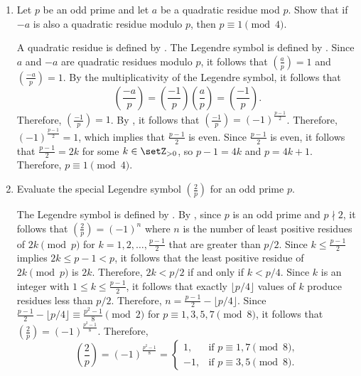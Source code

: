 \begin{enumerate}
  \item Let $p$ be an odd prime and let $a$ be a quadratic residue mod $p$. Show that if $-a$ is also a quadratic residue modulo $p$, then $p \equiv 1 \pmod{4}$.
  \begin{subprove}
    A quadratic residue is defined by .
    The Legendre symbol is defined by .
    Since $a$ and $-a$ are quadratic residues modulo $p$, it follows that $\left(\frac{a}{p}\right) = 1$ and $\left(\frac{-a}{p}\right) = 1$.
    By the multiplicativity of the Legendre symbol, it follows that
    \[
    \left(\frac{-a}{p}\right) = \left(\frac{-1}{p}\right)\left(\frac{a}{p}\right) = \left(\frac{-1}{p}\right).
    \]
    Therefore, $\left(\frac{-1}{p}\right) = 1$.
    By , it follows that $\left(\frac{-1}{p}\right) = (-1)^{\frac{p-1}{2}}$.
    Therefore, $(-1)^{\frac{p-1}{2}} = 1$, which implies that $\frac{p-1}{2}$ is even.
    Since $\frac{p-1}{2}$ is even, it follows that $\frac{p-1}{2} = 2k$ for some $k \in \setZ_{>0}$, so $p-1 = 4k$ and $p = 4k+1$.
    Therefore, $p \equiv 1 \pmod{4}$.
  \end{subprove}

  \item\label{thm:4.8} Evaluate the special Legendre symbol $\left(\frac{2}{p}\right)$ for an odd prime $p$.
  \begin{subprove}
    The Legendre symbol is defined by .
    By , since $p$ is an odd prime and $p \nmid 2$, it follows that $\left(\frac{2}{p}\right) = (-1)^n$ where $n$ is the number of least positive residues of $2k \pmod{p}$ for $k=1,2,\ldots,\frac{p-1}{2}$ that are greater than $p/2$.
    Since $k \leq \frac{p-1}{2}$ implies $2k \leq p-1 < p$, it follows that the least positive residue of $2k \pmod{p}$ is $2k$.
    Therefore, $2k < p/2$ if and only if $k < p/4$.
    Since $k$ is an integer with $1 \leq k \leq \frac{p-1}{2}$, it follows that exactly $\lfloor p/4 \rfloor$ values of $k$ produce residues less than $p/2$.
    Therefore, $n = \frac{p-1}{2} - \lfloor p/4 \rfloor$.
    Since $\frac{p-1}{2} - \lfloor p/4 \rfloor \equiv \frac{p^2-1}{8} \pmod{2}$ for $p \equiv 1,3,5,7 \pmod{8}$, it follows that $\left(\frac{2}{p}\right) = (-1)^{\frac{p^2-1}{8}}$.
    Therefore, 
    \[
    \left(\frac{2}{p}\right)=(-1)^{\frac{p^2-1}{8}}=
    \begin{cases}
    1, & \text{if } p\equiv 1,7\pmod 8,\\[4pt]
    -1,& \text{if } p\equiv 3,5\pmod 8.
    \end{cases}
    \]
  \end{subprove}
  

\end{enumerate}
